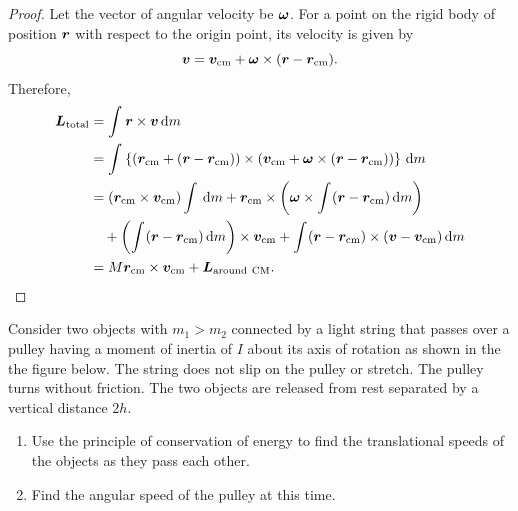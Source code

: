 \documentclass{article}
\begin{document}
\begin{proof}
	Let the vector of angular velocity be $\boldsymbol{\omega}$. For a point on the rigid body of position $\boldsymbol{r}$ with respect to the origin point, its velocity is given by
	\[ \boldsymbol{v} = \boldsymbol{v}_{\mathrm{cm}} + \boldsymbol{\omega} \times (\boldsymbol{r} - \boldsymbol{r}_{\mathrm{cm}}). \]
	Therefore,
	\begin{align*}
		\boldsymbol{L}_{\mathrm{total}}
		&= \int_{}^{}\boldsymbol{r} \times \boldsymbol{v} \,\mathrm{d} m \\
		&= \int_{}^{}\left\{ (\boldsymbol{r}_{\mathrm{cm}} + (\boldsymbol{r} - \boldsymbol{r}_{\mathrm{cm}})) \times (\boldsymbol{v}_{\mathrm{cm}} + \boldsymbol{\omega} \times (\boldsymbol{r} - \boldsymbol{r}_{\mathrm{cm}})) \right\}\,\mathrm{d} m \\
		&= (\boldsymbol{r}_{\mathrm{cm}} \times \boldsymbol{v}_{\mathrm{cm}}) \int_{}^{}\,\mathrm{d} m 
		+ \boldsymbol{r}_{\mathrm{cm}} \times \left( \boldsymbol{\omega} \times \int_{}^{}(\boldsymbol{r} - \boldsymbol{r}_{\mathrm{cm}}) \,\mathrm{d} m \right) \\
		&\quad + \left( \int_{}^{}(\boldsymbol{r} - \boldsymbol{r}_{\mathrm{cm}}) \,\mathrm{d} m \right) \times \boldsymbol{v}_{\mathrm{cm}} 
		+ \int_{}^{}(\boldsymbol{r} - \boldsymbol{r}_{\mathrm{cm}}) \times (\boldsymbol{v} - \boldsymbol{v}_{\mathrm{cm}}) \,\mathrm{d} m \\
		&= M \boldsymbol{r}_{\mathrm{cm}} \times \boldsymbol{v}_\mathrm{cm} + \boldsymbol{L}_{\mathrm{around\ CM}}. 
	\end{align*}
\end{proof}



\begin{problem}
Consider two objects with $m_1>m_2$ connected by a light string that passes over a pulley having a moment of inertia of $I$ about its axis of rotation as shown in the the figure below. The string does not slip on the pulley or stretch. The pulley turns without friction. The two objects are released from rest separated by a vertical distance $2h$.
\begin{enumerate}
  \item[a)] Use the principle of conservation of energy to find the translational speeds of the objects as they pass each other.
  \item[b)] Find the angular speed of the pulley at this time.
\end{enumerate}
\begin{center}
\end{center}
\end{problem}
\end{document}
